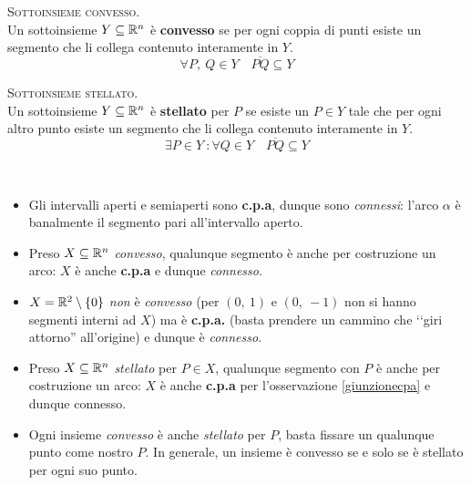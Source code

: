 \begin{define}\textsc{Sottoinsieme convesso.}\\
	Un sottoinsieme $Y\subseteq\mathbb{R}^n$ è \textbf{convesso} se per ogni coppia di punti esiste un segmento che li collega contenuto interamente in $Y$.
	\begin{equation}
		\forall P,\ Q\in Y\quad \overline{PQ}\subseteq Y
	\end{equation}
\vspace{-6mm}
\end{define}
\begin{define}\textsc{Sottoinsieme stellato.}\\
	Un sottoinsieme $Y\subseteq\mathbb{R}^n$ è \textbf{stellato} per $P$ se esiste un $P\in Y$ tale che per ogni altro punto esiste un segmento che li collega contenuto interamente in $Y$.
	\begin{equation}
		\exists P \in Y\ \colon \forall Q\in Y\quad \overline{PQ}\subseteq Y
	\end{equation}
\vspace{-6mm}
\end{define}
\begin{examples}~{}
\begin{itemize}
	\item Gli intervalli aperti e semiaperti sono \textbf{c.p.a}, dunque sono \textit{connessi}: l'arco $\alpha$ è banalmente il segmento pari all'intervallo aperto.
	\item Preso $X\subseteq\mathbb{R}^n$ \textit{convesso}, qualunque segmento è anche per costruzione un arco: $X$ è anche \textbf{c.p.a} e dunque \textit{connesso}.
	\item $X=\mathbb{R}^{2}\setminus\left\{0\right\}$ \textit{non} è \textit{convesso} (per $\left(0,\ 1\right)$ e $\left(0,\ -1\right)$ non si hanno segmenti interni ad $X$) ma è \textbf{c.p.a.} (basta prendere un cammino che ‘‘giri attorno'' all'origine) e dunque è \textit{connesso}.
	\item Preso $X\subseteq\mathbb{R}^n$ \textit{stellato} per $P\in X$, qualunque segmento con $P$ è anche per costruzione un arco: $X$ è anche \textbf{c.p.a} per l'osservazione \ref{giunzionecpa} e dunque {connesso}.
	\item Ogni insieme \textit{convesso} è anche \textit{stellato} per $P$, basta fissare un qualunque punto come nostro $P$. In generale, un insieme è convesso se e solo se è stellato per ogni suo punto.
\end{itemize}
\vspace{-3mm}
\end{examples}
